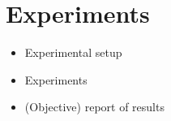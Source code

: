 \chapter{Experiments}


\begin{itemize}
	\item Experimental setup
	\item Experiments
	\item (Objective) report of results
\end{itemize}

